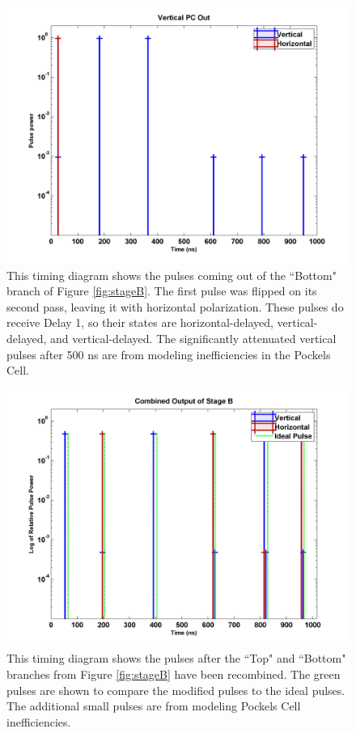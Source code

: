\documentclass[pdftex,12pt,a4paper]{article}
\begin{document}
\begin{figure}[H]
\centering
\includegraphics[scale=0.6]{vertPCOut.png} \caption{This timing diagram shows the pulses coming out of the ``Bottom" branch of Figure \ref{fig:stageB}. The first pulse was flipped on its second pass, leaving it with horizontal polarization. These pulses do receive Delay 1, so their states are horizontal-delayed, vertical-delayed, and vertical-delayed. The significantly attenuated vertical pulses after 500 ns are from modeling inefficiencies in the Pockels Cell.}
\label{fig:timing_B2}
\end{figure}

\begin{figure}[H]
\centering

\includegraphics[scale=0.6]{RotatedPulses.png} \caption{This timing diagram shows the pulses after the ``Top" and ``Bottom" branches from Figure \ref{fig:stageB} have been recombined. The green pulses are shown to compare the modified pulses to the ideal pulses. The additional small pulses are from modeling Pockels Cell inefficiencies.}
\label{fig:timing_B3}
\end{figure}
\end{document}

